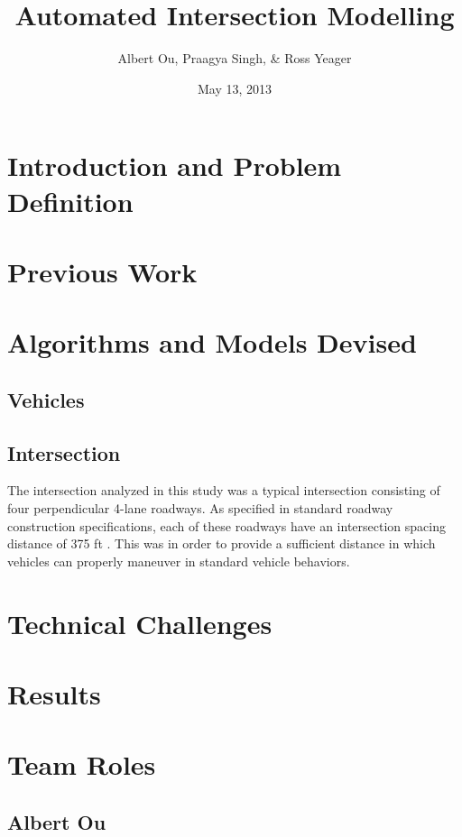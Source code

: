 \documentclass[10pt]{article}
\title{Automated Intersection Modelling}
\author{Albert Ou, Praagya Singh, & Ross Yeager}
\date{May 13, 2013}
\begin{document}
\maketitle
\section{Introduction and Problem Definition}

\section{Previous Work}

\section{Algorithms and Models Devised}

\subsection{Vehicles}

\subsection{Intersection}
The intersection analyzed in this study was a typical intersection consisting of four perpendicular 4-lane roadways.   As specified in standard roadway construction specifications, each of these roadways have an intersection spacing distance of 375 ft .
This was in order to provide a sufficient distance in which vehicles can properly maneuver in standard vehicle behaviors.

\section{Technical Challenges}

\section{Results}

\section{Team Roles}

\subsection{Albert Ou}
\end{document}
